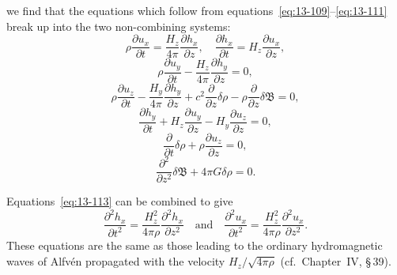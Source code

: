 
we find that the equations which follow from equations~\eqref{eq:13-109}--\eqref{eq:13-111} break up into the two non-combining systems:
\begin{equation}
\label{eq:13-113}
\rho\frac{\partial u_x}{\partial t} = \frac{H_z}{4\pi}\frac{\partial h_x}{\partial z}, \quad \frac{\partial h_x}{\partial t} = H_z\frac{\partial u_x}{\partial z},
\end{equation}
\begin{equation}
\label{eq:13-114}
\rho\frac{\partial u_y}{\partial t} - \frac{H_z}{4\pi}\frac{\partial h_y}{\partial z} = 0,
\end{equation}
\begin{equation}
\label{eq:13-115}
\rho\frac{\partial u_z}{\partial t} - \frac{H_y}{4\pi}\frac{\partial h_y}{\partial z} + c^2\frac{\partial}{\partial z}\delta\rho - \rho\frac{\partial}{\partial z}\delta\mathfrak{B} = 0,
\end{equation}
\begin{equation}
\label{eq:13-116}
\frac{\partial h_y}{\partial t} + H_z\frac{\partial u_y}{\partial z} - H_y\frac{\partial u_z}{\partial z} = 0,
\end{equation}
\begin{equation}
\label{eq:13-117}
\frac{\partial}{\partial t}\delta\rho + \rho\frac{\partial u_z}{\partial z} = 0,
\end{equation}
\begin{equation}
\label{eq:13-118}
\frac{\partial^2}{\partial z^2}\delta\mathfrak{B} + 4\pi G\delta\rho = 0.
\end{equation}

Equations~\eqref{eq:13-113} can be combined to give
\begin{equation}
\label{eq:13-119}
\frac{\partial^2 h_x}{\partial t^2} = \frac{H_z^2}{4\pi\rho}\frac{\partial^2 h_x}{\partial z^2} \quad \text{and} \quad \frac{\partial^2 u_x}{\partial t^2} = \frac{H_z^2}{4\pi\rho}\frac{\partial^2 u_x}{\partial z^2}.
\end{equation}
These equations are the same as those leading to the ordinary hydromagnetic waves of Alfv\'en propagated with the velocity $H_z/\sqrt{4\pi\rho}$ (cf.\ Chapter~IV, \S\,39).

